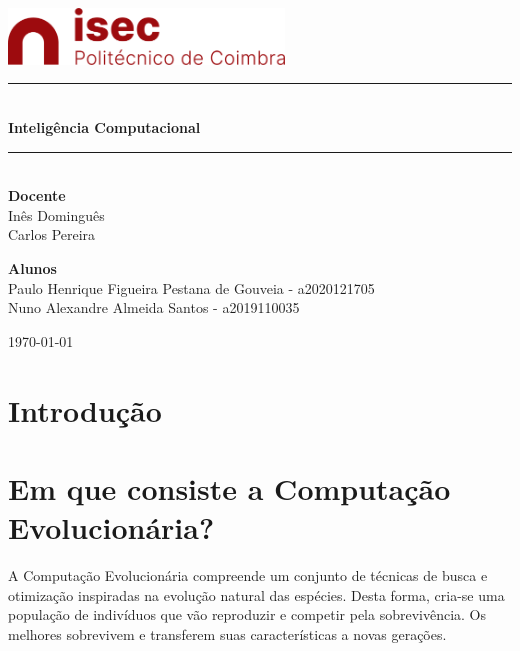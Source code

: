\documentclass[10pt]{article}
\newcommand{\HRule}{\rule{\linewidth}{0.5mm}}
\begin{document}
\begin{titlepage}
\begin{center}

\includegraphics[width=0.55\textwidth]{img/logo-isec-transparente.png}~\\[2cm]


\HRule \\[0.4cm]
{ \LARGE 
  \textbf{Inteligência Computacional}\\[0.4cm]
}
\HRule \\[1.5cm]

{ \large
  \textbf{Docente} \\[0.1cm]
  Inês Dominguês \\ Carlos Pereira \\[2.5cm]
}


{ \large
  \textbf{Alunos} \\[0.1cm]
  Paulo Henrique Figueira Pestana de Gouveia - a2020121705 \\[0.1cm]
  Nuno Alexandre Almeida Santos - a2019110035\\[0.1cm]
}

\vfill



{\large \today}
 
\end{center}
\end{titlepage}


\newpage



\tableofcontents
{}
\newpage
\setcounter{page}{1}

\large
\section{Introdução}\label{sec:intro}

\section{Em que consiste a Computação Evolucionária?}\label{sec:apre-da-org}
A Computação Evolucionária compreende um conjunto de técnicas de busca e otimização inspiradas na 
evolução natural das espécies. Desta forma, cria-se uma população de indivíduos que vão reproduzir e 
competir pela sobrevivência. Os melhores sobrevivem e transferem suas características a novas gerações.
\end{document}
